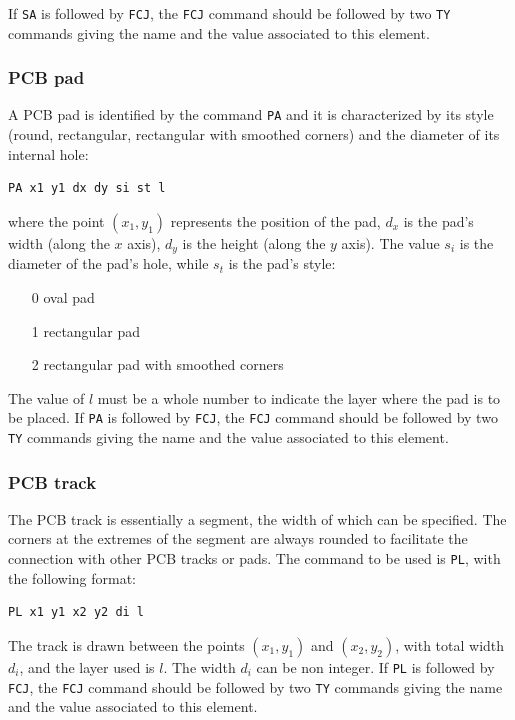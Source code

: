 \documentclass[10pt,a4paper,twoside]{scrreprt}
\begin{document}
If \lstinline!SA! is followed by \lstinline!FCJ!, the \lstinline!FCJ! command should be followed by two \lstinline!TY! commands giving the name and the value associated to this element.

\subsubsection{PCB pad}

A PCB pad is identified by the command \lstinline!PA!
and it is characterized by its style (round, rectangular, rectangular
with smoothed corners) and the diameter of its internal hole:
\begin{lstlisting}
PA x1 y1 dx dy si st l
\end{lstlisting}
where the point $(x_{1},y_{1})$
represents the position of the pad, $d_{x}$ is the pad's width (along
the $x$ axis), $d_{y}$ is the height (along the $y$ axis). The
value $s_{i}$ is the diameter of the pad's hole, while $s_{t}$ is
the pad's style:
\begin{itemize}
\item [0] oval pad
\item [1] rectangular pad
\item [2] rectangular pad with smoothed corners
\end{itemize}
The value of $l$ must be a whole number to indicate the layer where
the pad is to be placed.
If \lstinline!PA! is followed by \lstinline!FCJ!, the \lstinline!FCJ! command should be followed by two \lstinline!TY! commands giving the name and the value associated to this element.

\subsubsection{PCB track}

The PCB track is essentially a segment, the width
of which can be specified. The corners at the extremes of the segment
are always rounded to facilitate the connection with other PCB tracks
or pads. The command to be used is \lstinline!PL!, with
the following format:
\begin{lstlisting}
PL x1 y1 x2 y2 di l
\end{lstlisting}
The track is drawn between the points $(x_{1},y_{1})$ and $(x_{2},y_{2})$,
with total width $d_{i}$, and the layer used is $l$. The width $d_{i}$ can be non integer.
If \lstinline!PL! is followed by \lstinline!FCJ!, the \lstinline!FCJ! command should be followed by two \lstinline!TY! commands giving the name and the value associated to this element.
\end{document}
